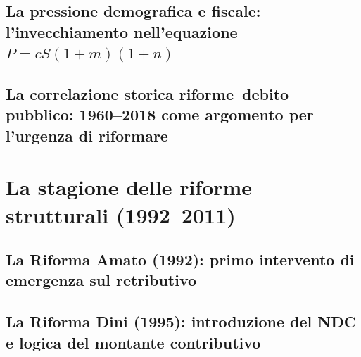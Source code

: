     \subsection{La pressione demografica e fiscale:
                l'invecchiamento nell'equazione $P = cS(1+m)(1+n)$}
    \subsection{La correlazione storica riforme--debito pubblico:
                1960--2018 come argomento per l'urgenza di riformare}

\section{La stagione delle riforme strutturali (1992--2011)}

    \subsection{La Riforma Amato (1992):
                primo intervento di emergenza sul retributivo}
    \subsection{La Riforma Dini (1995):
                introduzione del NDC e logica del montante contributivo}
